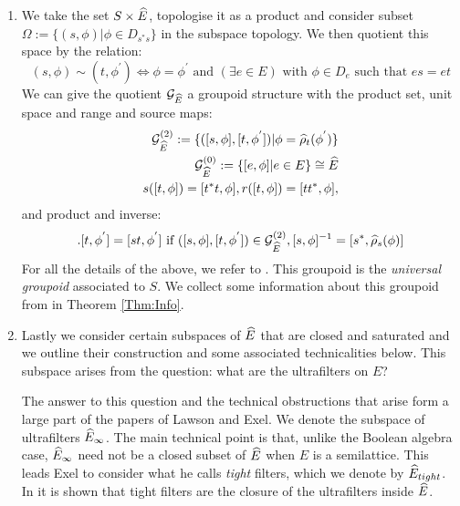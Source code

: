 \begin{definition}
\begin{enumerate}
\item We take the set $S \times \widehat{E}$, topologise it as a product and consider subset $\Omega:= \lbrace (s, \phi) | \phi \in D_{s^{*}s} \rbrace$ in the subspace topology. We then quotient this space by the relation:
\begin{equation*}
(s, \phi) \sim (t, \phi^{'}) \Leftrightarrow \phi=\phi^{'} \mbox{ and } (\exists e \in E) \mbox{ with } \phi \in D_{e} \mbox{ such that } es=et
\end{equation*}
We can give the quotient $\mathcal{G}_{\widehat{E}}$ a groupoid structure with the product set, unit space and range and source maps:
\begin{eqnarray*}
\mathcal{G}_{\widehat{E}}^{(2)}:=\lbrace ([s,\phi],[t,\phi^{'}]) | \phi=\widehat{\rho}_{t}(\phi^{'}) \rbrace \\
\mathcal{G}_{\widehat{E}}^{(0)}:= \lbrace [e,\phi] | e \in E \rbrace \cong \widehat{E} \\
s([t,\phi])=[t^{*}t,\phi], r([t,\phi])=[tt^{*},\phi], 
\end{eqnarray*}
and product and inverse:
\begin{eqnarray*}
[s,\phi].[t,\phi^{'}]= [st,\phi^{'}] \mbox{ if } ([s,\phi],[t,\phi^{'}]) \in \G_{\E}^{(2)}, [s,\phi]^{-1} = [s^{*},\widehat{\rho}_{s}(\phi)] 
\end{eqnarray*}
For all the details of the above, we refer to \cite[Section 4]{MR2419901}. This groupoid is the \textit{universal groupoid} associated to $S$. We collect some information about this groupoid from \cite{MR2419901,MR1724106} in Theorem \ref{Thm:Info}.
\item Lastly we consider certain subspaces of $\widehat{E}$ that are closed and saturated and we outline their construction and some associated technicalities below. This subspace arises from the question: what are the ultrafilters on $E$?

The answer to this question and the technical obstructions that arise form a large part of the papers \cite{MR2419901,MR2672179} of Lawson and Exel. We denote the subspace of ultrafilters $\widehat{E}_{\infty}$. The main technical point is that, unlike the Boolean algebra case, $\widehat{E}_{\infty}$ need not be a closed subset of $\widehat{E}$ when $E$ is a semilattice. This leads Exel to consider what he calls \textit{tight} filters, which we denote by $\widehat{E}_{tight}$. In \cite{MR2419901} it is shown that tight filters are the closure of the ultrafilters inside $\widehat{E}$. 

\end{enumerate}
\end{definition}

